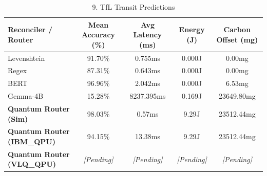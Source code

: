 
\begin{table}[htbp]
  \centering
  \caption{9. TfL Transit Predictions}
  \label{tab:9__tfl_transit_predictions}
  \begin{tabular}{lcccc}
    \hline
    \textbf{Reconciler / Router} & \textbf{Mean Accuracy (\%)} & \textbf{Avg Latency (ms)} & \textbf{Energy (J)} & \textbf{Carbon Offset (mg)} \\
    \hline
    Levenshtein & 91.70\% & 0.755ms & 0.000J & 0.00mg \\
    Regex & 87.31\% & 0.643ms & 0.000J & 0.00mg \\
    BERT & 96.96\% & 2.042ms & 0.000J & 6.53mg \\
    Gemma-4B & 15.28\% & 8237.395ms & 0.169J & 23649.80mg \\
    \textbf{Quantum Router (Sim)} & 98.03\% & 0.57ms & 9.29J & 23512.44mg \\
    \textbf{Quantum Router (IBM\_QPU)} & 94.15\% & 13.38ms & 9.29J & 23512.44mg \\
    \textbf{Quantum Router (VLQ\_QPU)} & \textit{[Pending]} & \textit{[Pending]} & \textit{[Pending]} & \textit{[Pending]} \\
    \hline
  \end{tabular}
\end{table}


